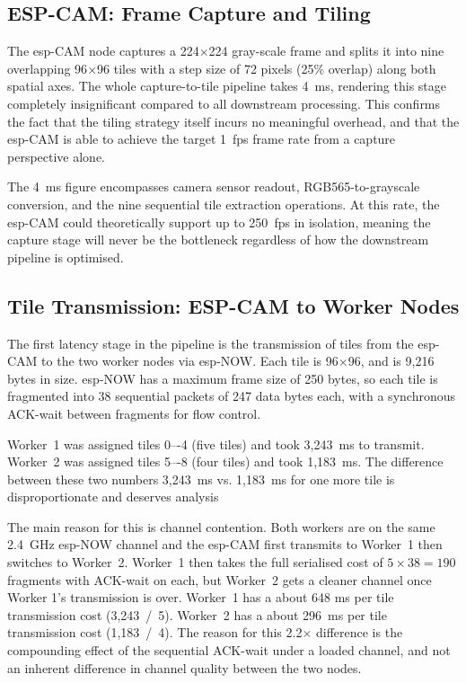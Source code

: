 \subsection{ESP-CAM: Frame Capture and Tiling}
 
The \gls{esp}-CAM node captures a 224$\times$224 gray-scale frame and splits it into nine overlapping 96$\times$96 tiles with a step size of 72 pixels (25\% overlap) along both spatial axes. The whole capture-to-tile pipeline takes 4~ms, rendering this stage completely insignificant compared to all downstream processing. This confirms the fact that the tiling strategy itself incurs no meaningful overhead, and that the \gls{esp}-CAM is able to achieve the target 1~\gls{fps} frame rate from a capture perspective alone.
 
The 4~ms figure encompasses camera sensor readout, RGB565-to-grayscale conversion, and
the nine sequential tile extraction operations. At this rate, the \gls{esp}-CAM could
theoretically support up to 250~\gls{fps} in isolation, meaning the capture stage will
never be the bottleneck regardless of how the downstream pipeline is optimised.
 
\subsection{Tile Transmission: ESP-CAM to Worker Nodes}
 
The first latency stage in the pipeline is the transmission of tiles from the \gls{esp}-CAM to the two worker nodes via \gls{esp}-NOW. Each tile is 96$\times$96, and is 9,216 bytes in size. \gls{esp}-NOW has a maximum frame size of 250 bytes, so each tile is fragmented into 38 sequential packets of 247 data bytes each, with a synchronous ACK-wait between fragments for flow control.
 
Worker~1 was assigned tiles 0–-4 (five tiles) and took 3,243~ms to transmit. Worker~2 was assigned tiles 5–-8 (four tiles) and took 1,183~ms. The difference between these two numbers 3,243~ms vs. 1,183~ms for one more tile is disproportionate and deserves analysis
 
The main reason for this is channel contention. Both workers are on the same 2.4~GHz \gls{esp}-NOW channel and the \gls{esp}-CAM first transmits to Worker~1 then switches to Worker~2. Worker~1 then takes the full serialised cost of $5\times38 = 190$ fragments with ACK-wait on each, but Worker~2 gets a cleaner channel once Worker 1's transmission is over. Worker~1 has a about 648 ms per tile transmission cost (3,243~/~5). Worker~2 has a about 296~ms per tile transmission cost (1,183~/~4). The reason for this 2.2$\times$ difference is the compounding effect of the sequential ACK-wait under a loaded channel, and not an inherent difference in channel quality between the two nodes.
 
